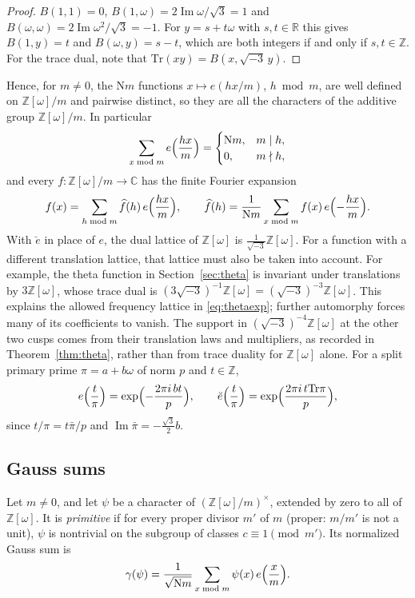 \documentclass[11pt]{article}
\numberwithin{equation}{section}
\newcommand{\N}{\mathrm N}
\newcommand{\Tr}{\mathrm{Tr}}
\newcommand{\OO}{\mathbb Z[\omega]}
\newcommand{\Z}{\mathbb Z}
\theoremstyle{definition}
\theoremstyle{remark}
\begin{document}
\begin{proof}
$B(1,1)=0$, $B(1,\omega)=2\operatorname{Im}\omega/\sqrt3=1$ and $B(\omega,\omega)=2\operatorname{Im}\omega^2/\sqrt3=-1$.
For $y=s+t\omega$ with $s,t\in\mathbb R$ this gives $B(1,y)=t$ and $B(\omega,y)=s-t$, which are both integers
if and only if $s,t\in\Z$. For the trace dual, note that $\Tr(xy)=B(x,\sqrt{-3}\,y)$.
\end{proof}

Hence, for $m\ne0$, the $\N m$ functions $x\mapsto e(hx/m)$, $h\bmod m$, are well defined on $\OO/m$ and
pairwise distinct, so they are all the characters of the additive group $\OO/m$. In particular
\begin{equation}\label{eq:orthog}
 \sum_{x\bmod m}e\Bigl(\frac{hx}m\Bigr)=\begin{cases}\N m,&m\mid h,\\0,&m\nmid h,\end{cases}
\end{equation}
and every $f:\OO/m\to\mathbb C$ has the finite Fourier expansion
\begin{equation}\label{eq:finitefourier}
 f(x)=\sum_{h\bmod m}\widehat f(h)\,e\Bigl(\frac{hx}m\Bigr),\qquad
 \widehat f(h)=\frac1{\N m}\sum_{x\bmod m}f(x)\,e\Bigl(-\frac{hx}m\Bigr).
\end{equation}
With $\breve e$ in place of $e$, the dual lattice of $\OO$ is $\frac1{\sqrt{-3}}\OO$.
For a function with a different translation lattice, that lattice must also be taken into account.
For example, the theta function in Section~\ref{sec:theta} is invariant under translations by $3\OO$, whose
trace dual is $(3\sqrt{-3})^{-1}\OO=(\sqrt{-3})^{-3}\OO$. This explains the allowed frequency lattice in
\eqref{eq:thetaexp}; further automorphy forces many of its coefficients to vanish. The support in
$(\sqrt{-3})^{-4}\OO$ at the other two cusps comes from their translation laws and multipliers, as recorded
in Theorem~\ref{thm:theta}, rather than from trace duality for $\OO$ alone.
For a split primary prime $\pi=a+b\omega$ of norm $p$ and $t\in\Z$,
\begin{equation}\label{eq:eatrational}
 e\Bigl(\frac t\pi\Bigr)=\exp\Bigl(-\frac{2\pi i\,bt}p\Bigr),\qquad
 \breve e\Bigl(\frac t\pi\Bigr)=\exp\Bigl(\frac{2\pi i\,t\Tr\pi}p\Bigr),
\end{equation}
since $t/\pi=t\bar\pi/p$ and $\operatorname{Im}\bar\pi=-\frac{\sqrt3}2b$.

\subsection{Gauss sums}\label{sec:gaussids}
Let $m\ne0$, and let $\psi$ be a character of $(\OO/m)^\times$, extended by zero to all of $\OO$. It is
\emph{primitive} if for every proper divisor $m'$ of $m$ (proper: $m/m'$ is not a unit), $\psi$ is nontrivial on
the subgroup of classes $c\equiv1\pmod{m'}$. Its normalized Gauss sum is
\begin{equation}\label{eq:gaussdef}
 \gamma(\psi)=\frac1{\sqrt{\N m}}\sum_{x\bmod m}\psi(x)\,e\Bigl(\frac xm\Bigr).
\end{equation}
\end{document}
